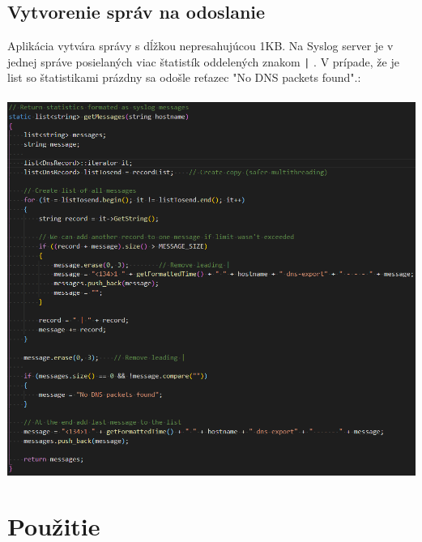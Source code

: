 \documentclass{article}
\begin{document}
        \subsection{Vytvorenie správ na odoslanie}
        Aplikácia vytvára správy s dĺžkou nepresahujúcou 1KB. Na Syslog server je v jednej správe posielaných viac štatistík oddelených znakom \texttt{|} .
        V prípade, že je list so štatistikami prázdny sa odošle reťazec "No DNS packets found".:\\\\
        \includegraphics[scale=0.6]{messages.png}

        \newpage
        
    \section{Použitie}
\end{document}
